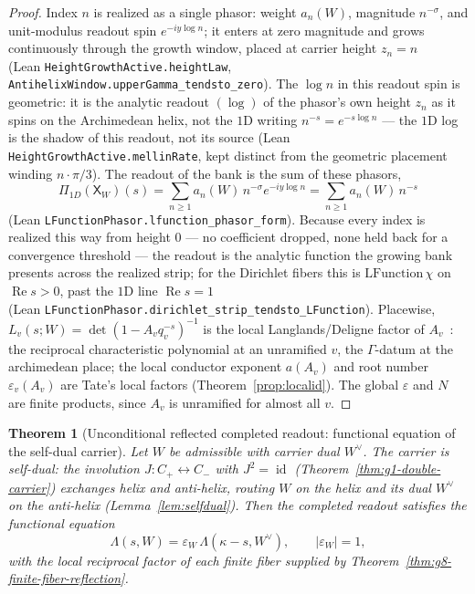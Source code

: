 \documentclass[11pt]{article}
\newtheorem{theorem}{Theorem}
\theoremstyle{definition}
\renewcommand{\Re}{\operatorname{Re}}
\begin{document}
\begin{proof}
Index \(n\) is realized as a single phasor: weight \(a_n(W)\), magnitude
\(n^{-\sigma}\), and unit-modulus readout spin \(e^{-iy\log n}\); it enters at
zero magnitude and grows continuously through the growth window, placed at
carrier height \(z_n=n\) \\ 
(Lean \texttt{HeightGrowthActive.heightLaw},
\texttt{AntihelixWindow.upperGamma\_tendsto\_zero}).  The \(\log n\) in this
readout spin is geometric: it is the analytic readout \((\log)\) of the
phasor's own height \(z_n\) as it spins on the Archimedean helix, not the \(1\)D
writing \(n^{-s}=e^{-s\log n}\) --- the \(1\)D log is the shadow of this readout,
not its source (Lean \texttt{HeightGrowthActive.mellinRate}, kept distinct from
the geometric placement winding \(n\cdot\pi/3\)).  The readout of the bank is the
sum of these phasors,
\[
\Pi_{1D}(\mathsf X_W)(s)=\sum_{n\ge1}a_n(W)\,n^{-\sigma}e^{-iy\log n}
=\sum_{n\ge1}a_n(W)\,n^{-s}
\]
(Lean \texttt{LFunctionPhasor.lfunction\_phasor\_form}).  Because every index is
realized this way from height \(0\) --- no coefficient dropped, none held back
for a convergence threshold --- the readout is the analytic function the growing
bank presents across the realized strip; for the Dirichlet fibers this is
\(\mathrm{LFunction}\,\chi\) on \(\Re s>0\), past the \(1\)D line \(\Re s=1\) \\
(Lean \texttt{LFunctionPhasor.dirichlet\_strip\_tendsto\_LFunction}).  Placewise,
\(L_v(s;W)=\det(1-A_v q_v^{-s})^{-1}\) is the local Langlands/Deligne factor of
\(A_v\)~\cite{Deligne}: the reciprocal characteristic polynomial at an unramified \(v\), the
\(\Gamma\)-datum at the archimedean place; the local conductor exponent
\(a(A_v)\) and root number \(\varepsilon_v(A_v)\) are Tate's local factors
(Theorem~\ref{prop:localid}).  The global \(\varepsilon\) and \(N\) are
finite products, since \(A_v\) is unramified for almost all \(v\).
\end{proof}

\begin{theorem}[Unconditional reflected completed readout: functional equation of the self-dual carrier]\label{thm:g8-reflected-completed-readout}
Let \(W\) be admissible with carrier dual \(W^\vee\).  The carrier is
\emph{self-dual}: the involution \(J:C_+\leftrightarrow C_-\) with
\(J^2=\operatorname{id}\) (Theorem~\ref{thm:g1-double-carrier}) exchanges helix
and anti-helix, routing \(W\) on the helix and its dual \(W^\vee\) on the
anti-helix (Lemma~\ref{lem:selfdual}).  Then the completed readout satisfies the
functional equation
\[
\Lambda(s,W)=\varepsilon_W\,\Lambda(\kappa-s,W^\vee),\qquad |\varepsilon_W|=1,
\]
with the local reciprocal factor of each finite fiber supplied by
Theorem~\ref{thm:g8-finite-fiber-reflection}.
\end{theorem}
\end{document}
